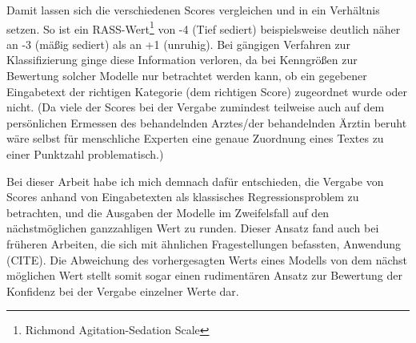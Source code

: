 Damit lassen sich die verschiedenen Scores vergleichen und in ein Verhältnis setzen. So ist ein RASS-Wert\footnote{Richmond Agitation-Sedation Scale} von -4 (Tief sediert) beispielsweise deutlich näher an -3 (mäßig sediert) als an +1 (unruhig). Bei gängigen Verfahren zur Klassifizierung ginge diese Information verloren, da bei Kenngrößen zur Bewertung solcher Modelle nur betrachtet werden kann, ob ein gegebener Eingabetext der richtigen Kategorie (dem richtigen Score) zugeordnet wurde oder nicht. (Da viele der Scores bei der Vergabe zumindest teilweise auch auf dem persönlichen Ermessen des behandelnden Arztes/der behandelnden Ärztin beruht wäre selbst für menschliche Experten eine genaue Zuordnung eines Textes zu einer Punktzahl problematisch.)

Bei dieser Arbeit habe ich mich demnach dafür entschieden, die Vergabe von Scores anhand von Eingabetexten als klassisches Regressionsproblem zu betrachten, und die Ausgaben der Modelle im Zweifelsfall auf den nächstmöglichen ganzzahligen Wert zu runden. Dieser Ansatz fand auch bei früheren Arbeiten, die sich mit ähnlichen Fragestellungen befassten, Anwendung (CITE). Die Abweichung des vorhergesagten Werts eines Modells von dem nächst möglichen Wert stellt somit sogar einen rudimentären Ansatz zur Bewertung der Konfidenz bei der Vergabe einzelner Werte dar.



